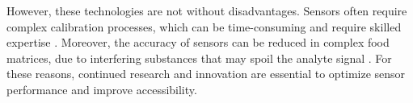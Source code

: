 However, these technologies are not without disadvantages. Sensors often require complex calibration processes, which can be time-consuming and require skilled expertise \citep{yangCNNLSTM2020}. Moreover, the accuracy of sensors can be reduced in complex food matrices, due to interfering substances that may spoil the analyte signal \citep{gillibertSurface2017,hanRatiometric2021}.
For these reasons, continued research and innovation are essential to optimize sensor performance and improve accessibility.
